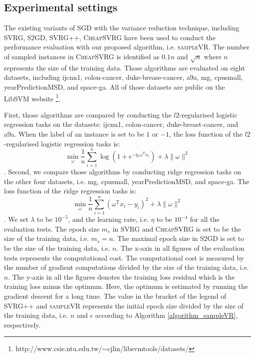 \documentclass[letterpaper]{article}
\begin{document}
\subsection{Experimental settings}
\label{sect_experimental_settings}
The existing variants of SGD with the variance reduction technique, including SVRG, S2GD, SVRG++, \textsc{CheapSVRG} have been used to conduct the performance evaluation with our proposed algorithm, i.e. \textsc{sampleVR}. The number of sampled instances in \textsc{CheapSVRG} is identified as $0.1n$ and $\sqrt{n}$ where $n$ represents the size of the training data.
Those algorithms are evaluated on eight datasets, including ijcnn1, colon-cancer, duke-brease-cancer, a9a, mg, cpusmall, yearPredictionMSD, and space-ga. All of those datasets are public on the LibSVM website \footnote{http://www.csie.ntu.edu.tw/$\sim$cjlin/libsvmtools/datasets/}. 

First, those algorithms are compared by conducting the $l2$-regularised logistic regression tasks on the datasets: ijcnn1, colon-cancer, duke-breast-cancer, and a9a. When the label of an instance is set to be $1$ or $-1$, the loss function of the $l2$-regularised logistic regression tasks is:
\begin{equation}
\label{standard_sgd}
\min\limits_\omega \frac{1}{n}\sum\limits_{i=1}^n \log(1+e^{-y_i \omega^\mathrm{T} x_i }) + \lambda \parallel \omega \parallel^2
\end{equation}. Second, we compare those algorithms by conducting ridge regression tasks on the other four datasets, i.e. mg, cpusmall, yearPredictionMSD, and space-ga. The loss function of the ridge regression tasks is:
\begin{equation}
\label{standard_sgd}
\min\limits_\omega \frac{1}{n}\sum\limits_{i=1}^n\left(\omega^{\mathrm{T}}x_i-y_i\right)^2 + \lambda \parallel \omega \parallel^2
\end{equation}. We set $\lambda$ to be $10^{-5}$, and the learning rate, i.e. $\eta$ to be $10^{-4}$ for all the evaluation tests.  The epoch size $m_s$ in SVRG and \textsc{CheapSVRG} is set to be the size of the training data, i.e. $m_s=n$. The maximal epoch size in S2GD is set to be the size of the training data, i.e. $n$.    The x-axis in all  figures of the evaluation tests represents the computational cost. The computational cost is measured by the number of gradient computations divided by  the size of the training data, i.e. $n$. The y-axis in all the figures denotes the training loss residual which is the training loss minus the optimum. Here, the optimum is estimated by running the gradient descent for a long time. The value in the bracket of the legend of SVRG++ and \textsc{sampleVR} represents the initial epoch size divided by the size of the training data, i.e. $n$ and $\epsilon$ according to Algorithm \ref{algorithm_sampleVR}, respectively.
\end{document}

